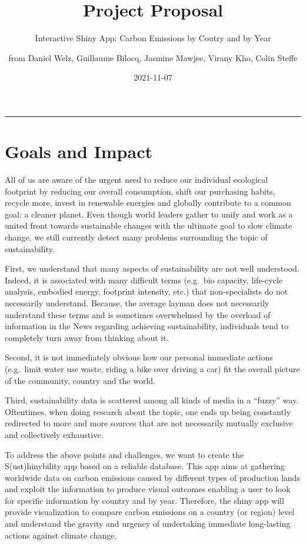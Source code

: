 \documentclass[
]{article}
\title{Project Proposal}
\subtitle{Interactive Shiny App: Carbon Emissions by Coutry and by Year}
\author{from Daniel Welz, Guillaume Bilocq, Jasmine Mawjee, Virany Kho,
Colin Steffe}
\date{2021-11-07}
\begin{document}
\maketitle

\begin{center}\rule{0.5\linewidth}{0.5pt}\end{center}

\hypertarget{goals-and-impact}{%
\section{Goals and Impact}\label{goals-and-impact}}

All of us are aware of the urgent need to reduce our individual
ecological footprint by reducing our overall consumption, shift our
purchasing habits, recycle more, invest in renewable energies and
globally contribute to a common goal: a cleaner planet. Even though
world leaders gather to unify and work as a united front towards
sustainable changes with the ultimate goal to slow climate change, we
still currently detect many problems surrounding the topic of
sustainability.

First, we understand that many aspects of sustainability are not well
understood. Indeed, it is associated with many difficult terms (e.g.~bio
capacity, life-cycle analysis, embodied energy, footprint intensity,
etc.) that non-specialists do not necessarily understand. Because, the
average layman does not necessarily understand these terms and is
sometimes overwhelmed by the overload of information in the News
regarding achieving sustainability, individuals tend to completely turn
away from thinking about it.

Second, it is not immediately obvious how our personal immediate actions
(e.g.~limit water use waste, riding a bike over driving a car) fit the
overall picture of the community, country and the world.

Third, sustainability data is scattered among all kinds of media in a
``fuzzy'' way. Oftentimes, when doing research about the topic, one ends
up being constantly redirected to more and more sources that are not
necessarily mutually exclusive and collectively exhaustive.

To address the above points and challenges, we want to create the
S(ust)hinybility app based on a reliable database. This app aims at
gathering worldwide data on carbon emissions caused by different types
of production lands and exploit the information to produce visual
outcomes enabling a user to look for specific information by country and
by year. Therefore, the shiny app will provide visualization to compare
carbon emissions on a country (or region) level and understand the
gravity and urgency of undertaking immediate long-lasting actions
against climate change.
\end{document}

